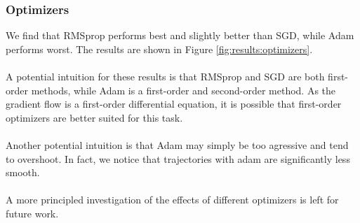 \documentclass[11pt]{article}
\begin{document}
\subsubsection{Optimizers}
We find that RMSprop performs best and slightly better than SGD, while Adam performs worst. The results are shown in Figure \ref{fig:results:optimizers}.
\\\\
A potential intuition for these results is that RMSprop and SGD are both first-order methods, while Adam is a first-order and second-order method. As the gradient flow is a first-order differential equation, it is possible that first-order optimizers are better suited for this task.
\\\\
Another potential intuition is that Adam may simply be too agressive and tend to overshoot. In fact, we notice that trajectories with adam are significantly less smooth.
\\\\
A more principled investigation of the effects of different optimizers is left for future work.
\end{document}

